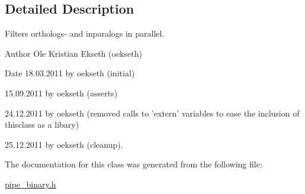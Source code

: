 \subsection{Detailed Description}
Filters orthologs-\/ and inparalogs in parallel. 

\begin{DoxyAuthor}{Author}
Ole Kristian Ekseth (oekseth) 
\end{DoxyAuthor}
\begin{DoxyDate}{Date}
18.03.2011 by oekseth (initial) 

15.09.2011 by oekseth (asserts) 

24.12.2011 by oekseth (removed calls to 'extern' variables to ease the inclusion of thisclass as a libary) 

25.12.2011 by oekseth (cleanup). 
\end{DoxyDate}


The documentation for this class was generated from the following file:\begin{DoxyCompactItemize}
\item 
\hyperlink{pipe__binary_8h}{pipe\_\-binary.h}\end{DoxyCompactItemize}
